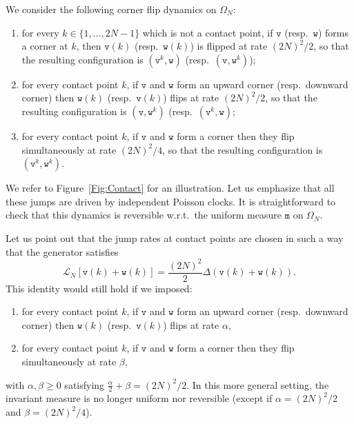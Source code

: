 \documentclass[AHL,Unicode,longabstracts]{cedram}
\theoremstyle{plain}
\newcommand{\ttv}{\mathtt{v}}
\newcommand{\ttw}{\mathtt{w}}
\newcommand{\ttm}{\mathtt{m}}
\newcommand{\cL}{\mathcal{L}}
\begin{document}
We consider the following corner flip dynamics on $\Omega_N$:
\begin{enumerate}
\item for every $k\in \{1,\dots,2N-1\}$ which is not a contact point, if $\ttv$ (resp.~$\ttw$) forms a corner at $k$, then $\ttv(k)$ (resp.~$\ttw(k)$) is flipped at rate $(2N)^2/2$, so that the resulting configuration is $(\ttv^k,\ttw)$ (resp.~$(\ttv,\ttw^k)$);
\item for every contact point $k$, if $\ttv$ and $\ttw$ form an upward corner (resp.~downward corner) then $\ttw(k)$ (resp.~$\ttv(k)$) flips at rate $(2N)^2/2$, so that the resulting configuration is $(\ttv,\ttw^k)$ (resp.~$(\ttv^k,\ttw)$;
\item for every contact point $k$, if $\ttv$ and $\ttw$ form a corner then they flip simultaneously at rate $(2N)^2/4$, so that the resulting configuration is $(\ttv^k,\ttw^k)$.
\end{enumerate}
We refer to Figure~\ref{Fig:Contact} for an illustration. Let us emphasize that all these jumps are driven by independent Poisson clocks. It is straightforward to check that this dynamics is reversible w.r.t.~the uniform measure $\ttm$ on $\Omega_N$.

\begin{rema}\label{rem:letus}
Let us point out that the jump rates at contact points are chosen in such a way that the generator satisfies
\[
\cL_N[\ttv(k)+\ttw(k)] = \frac{(2N)^2}{2} \Delta (\ttv(k) + \ttw(k)).
\]
This identity would still hold if we imposed:
\begin{enumerate}
\item for every contact point $k$, if $\ttv$ and $\ttw$ form an upward corner (resp.~downward corner) then $\ttw(k)$ (resp.~$\ttv(k)$) flips at rate $\alpha$,
\item for every contact point $k$, if $\ttv$ and $\ttw$ form a corner then they flip simultaneously at rate $\beta$,
\end{enumerate}
with $\alpha,\beta \ge 0$ satisfying $\frac{\alpha}{2} + \beta = (2N)^2/2$. In this more general setting, the invariant measure is no longer uniform nor reversible (except if $\alpha = (2N)^2/2$ and $\beta=(2N)^2/4$).
\end{rema}
\end{document}
